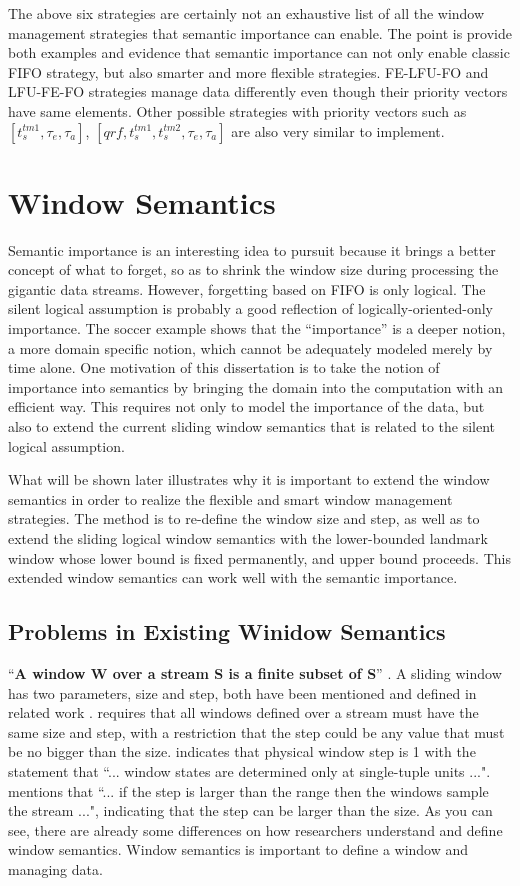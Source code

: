 The above six strategies are certainly not an exhaustive list of all the window management strategies that semantic importance can enable. 
The point is provide both examples and evidence that semantic importance can not only enable classic FIFO strategy, but also smarter and more flexible strategies. 
FE-LFU-FO and LFU-FE-FO strategies manage data differently even though their priority vectors have same elements. 
Other possible strategies with priority vectors such as $[t^{tm1}_{s}, \tau_{e}, \tau_{a}]$, $[qrf, t^{tm1}_{s}, t^{tm2}_{s}, \tau_{e}, \tau_{a}]$ are also very similar to implement.
%
\section{Window Semantics}
Semantic importance is an interesting idea to pursuit because it brings a better concept of what to forget, so as to shrink the window size during processing the gigantic data streams.
However, forgetting based on FIFO is only logical.
The silent logical assumption is probably a good reflection of logically-oriented-only importance.
The soccer example shows that the ``importance'' is a deeper notion, a more domain specific notion, which cannot be adequately modeled merely by time alone. 
One motivation of this dissertation is to take the notion of importance into semantics by bringing the domain into the computation with an efficient way. 
This requires not only to model the importance of the data, but also to extend the current sliding window semantics that is related to the silent logical assumption. 

What will be shown later illustrates why it is important to extend the window semantics in order to realize the flexible and smart window management strategies.
The method is to re-define the window size and step, as well as to extend the sliding logical window semantics with the lower-bounded landmark window whose lower bound is fixed permanently, and upper bound proceeds. 
This extended window semantics can work well with the semantic importance. 
%
\subsection{Problems in Existing Winidow Semantics}
``\textbf{A window W over a stream S is a finite subset of S}'' \cite{dindar2013modeling}.
A sliding window has two parameters, size and step, both have been mentioned and defined in related work \cite{beck2015lars} \cite{dindar2013modeling} \cite{prud2008sparql} \cite{botan2010secret} \cite{arasu2006cql}.
\cite{dindar2013modeling} requires that all windows defined over a stream must have the same size and step, with a restriction that the step could be any value that must be no bigger than the size.
\cite{patroumpas2006window} indicates that physical window step is 1 with the statement that ``... window states are determined only at single-tuple units ...". 
\cite{calbimonte2010enabling} mentions that ``... if the step is larger than the range then the windows sample the stream ...", indicating that the step can be larger than the size. 
As you can see, there are already some differences on how researchers understand and define window semantics. 
Window semantics is important to define a window and managing data.

